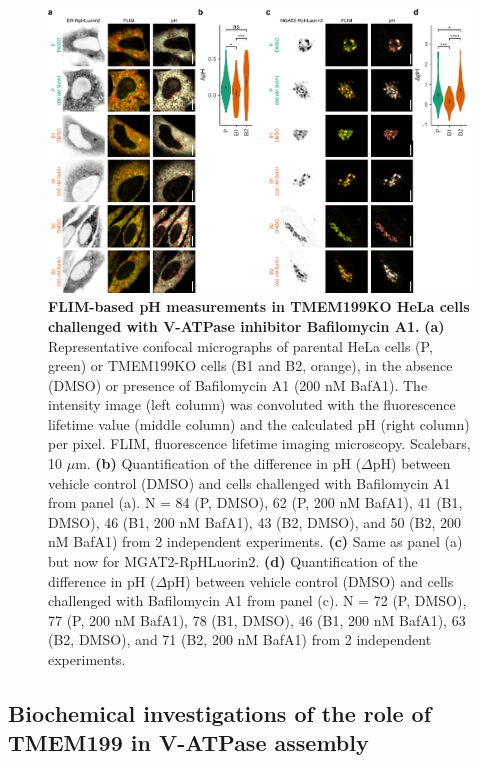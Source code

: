 \begin{figure}
    \includegraphics[keepaspectratio=true,width=\textwidth,height=\textheight]{chapters/chapter4/chapter4_Figure4.pdf}
    \caption{\textbf{FLIM-based pH measurements in TMEM199KO HeLa cells challenged with V-ATPase inhibitor Bafilomycin A1.} \textbf{(a)} Representative confocal micrographs of parental HeLa cells (P, green) or TMEM199KO cells (B1 and B2, orange), in the absence (DMSO) or presence of Bafilomycin A1 (200 nM BafA1). The intensity image (left column) was convoluted with the fluorescence lifetime value (middle column) and the calculated pH (right column) per pixel. FLIM, fluorescence lifetime imaging microscopy. Scalebars, 10 $\mu$m. \textbf{(b)} Quantification of the difference in pH ($\Delta$pH) between vehicle control (DMSO) and cells challenged with Bafilomycin A1 from panel (a). N = 84 (P, DMSO), 62 (P, 200 nM BafA1), 41 (B1, DMSO), 46 (B1, 200 nM BafA1), 43 (B2, DMSO), and 50 (B2, 200 nM BafA1) from 2 independent experiments. \textbf{(c)} Same as panel (a) but now for MGAT2-RpHLuorin2. \textbf{(d)} Quantification of the difference in pH ($\Delta$pH) between vehicle control (DMSO) and cells challenged with Bafilomycin A1 from panel (c). N = 72 (P, DMSO), 77 (P, 200 nM BafA1), 78 (B1, DMSO), 46 (B1, 200 nM BafA1), 63 (B2, DMSO), and 71 (B2, 200 nM BafA1) from 2 independent experiments.}
    \label{fig:ch4fig4}
\end{figure}

\subsection{Biochemical investigations of the role of TMEM199 in V-ATPase assembly}

